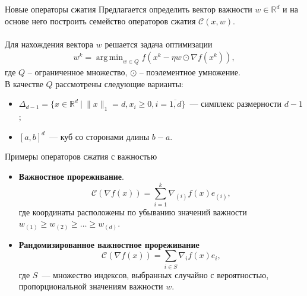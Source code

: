 \documentclass{beamer}
\DeclareMathOperator*{\argmin}{arg\,min}
\begin{document}

\begin{frame}{Новые операторы сжатия}
    Предлагается определить вектор важности $w \in \mathbb{R}^d$ и на основе него построить семейство операторов сжатия $\mathcal{C}(x, w)$.\\
    $ $\\
    Для нахождения вектора $w$ решается задача оптимизации
    \begin{align*}
     w^k = \argmin_{w \in Q} f(x^k - \eta w \odot \nabla f(x^k)),
    \end{align*}
    где $Q$ -- ограниченное множество, $\odot$ -- поэлементное умножение.\\

    В качестве $Q$ рассмотрены следующие варианты:
    \begin{itemize}
        \item $\Delta_{d - 1} = \{x \in \mathbb{R}^d ~|~ \|x\|_1 = d, x_i \geq 0, i = \overline{1, d}\}$~--- симплекс размерности $d - 1$;
        \item $[a, b]^d$~--- куб со сторонами длины $b - a$.
    \end{itemize}
\end{frame}


\begin{frame}{Примеры операторов сжатия с важностью}
    \begin{itemize}
        \item \textbf{Важностное прореживание}.\\
        \begin{equation}
            \mathcal{C}(\nabla f(x)) = \sum_{i=1}^k \nabla_{(i)} f(x) e_{(i)},
        \end{equation}
        где координаты расположены по убыванию значений важности $w_{(1)} \geq w_{(2)} \geq \dots \geq w_{(d)}$.
        \item \textbf{Рандомизированное важностное прореживание}\\
        \begin{equation}
            \mathcal{C}(\nabla f(x)) = \sum_{i \in S} \nabla_i f(x) e_i,
        \end{equation}
        где $S$~--- множество индексов, выбранных случайно с вероятностью, пропорциональной значениям важности $w$.
    \end{itemize}
\end{frame}
\end{document}
